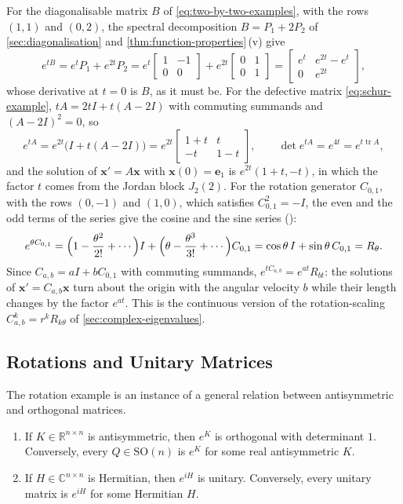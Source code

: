 For the diagonalisable matrix $B$ of \eqref{eq:two-by-two-examples}, with the rows $(1,1)$ and $(0,2)$, the spectral decomposition $B=P_1+2P_2$ of \cref{sec:diagonalisation} and \cref{thm:function-properties}\,(v) give
\[
e^{tB}=e^tP_1+e^{2t}P_2=e^t\begin{bmatrix}1&-1\\0&0\end{bmatrix}+e^{2t}\begin{bmatrix}0&1\\0&1\end{bmatrix}=\begin{bmatrix}e^t&e^{2t}-e^t\\0&e^{2t}\end{bmatrix},
\]
whose derivative at $t=0$ is $B$, as it must be. For the defective matrix \eqref{eq:schur-example}, $tA=2tI+t(A-2I)$ with commuting summands and $(A-2I)^2=0$, so
\[
e^{tA}=e^{2t}\bigl(I+t(A-2I)\bigr)=e^{2t}\begin{bmatrix}1+t&t\\-t&1-t\end{bmatrix},\qquad\det e^{tA}=e^{4t}=e^{t\operatorname{tr}A},
\]
and the solution of $\mathbf x'=A\mathbf x$ with $\mathbf x(0)=\mathbf e_1$ is $e^{2t}(1+t,-t)$, in which the factor $t$ comes from the Jordan block $J_2(2)$. For the rotation generator $C_{0,1}$, with the rows $(0,-1)$ and $(1,0)$, which satisfies $C_{0,1}^2=-I$, the even and the odd terms of the series give the cosine and the sine series ():
\[
e^{\theta C_{0,1}}=\Bigl(1-\frac{\theta^2}{2!}+\cdots\Bigr)I+\Bigl(\theta-\frac{\theta^3}{3!}+\cdots\Bigr)C_{0,1}=\cos\theta\,I+\sin\theta\,C_{0,1}=R_\theta .
\]
Since $C_{a,b}=aI+bC_{0,1}$ with commuting summands, $e^{tC_{a,b}}=e^{at}R_{bt}$: the solutions of $\mathbf x'=C_{a,b}\mathbf x$ turn about the origin with the angular velocity $b$ while their length changes by the factor $e^{at}$. This is the continuous version of the rotation-scaling $C_{a,b}^k=r^kR_{k\theta}$ of \cref{sec:complex-eigenvalues}.

\subsection{Rotations and Unitary Matrices}

The rotation example is an instance of a general relation between antisymmetric and orthogonal matrices.

\begin{proposition}
\label{prop:exp-orthogonal}
\leavevmode
\begin{enumerate}
\item If $K\in\mathbb R^{n\times n}$ is antisymmetric, then $e^K$ is orthogonal with determinant $1$. Conversely, every $Q\in\mathrm{SO}(n)$ is $e^K$ for some real antisymmetric $K$.
\item If $H\in\mathbb C^{n\times n}$ is Hermitian, then $e^{iH}$ is unitary. Conversely, every unitary matrix is $e^{iH}$ for some Hermitian $H$.
\end{enumerate}
\end{proposition}

